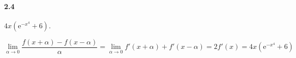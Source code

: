 \paragraph*{2.4} $4x\left(\mathrm{e}^{-x^4}+6\right)$.

\[
	\lim_{\alpha\to 0}\dfrac{f(x+\alpha)-f(x-\alpha)}{\alpha}=\lim_{\alpha\to 0}f'(x+\alpha)+f'(x-\alpha)=2f'(x)=4x\left(\mathrm{e}^{-x^4}+6\right)
\]